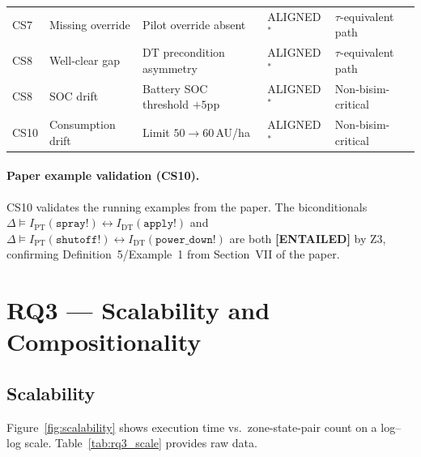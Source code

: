 \documentclass[10pt,a4paper]{article}
\newcommand{\WARN}[1]{\textcolor{warnred}{#1}}
\begin{document}
\begin{table}[htbp]
\begin{tabular}{@{}lllll@{}}
CS7  & Missing override & Pilot override absent                 & \WARN{ALIGNED${}^*$} & $\tau$-equivalent path \\
CS8  & Well-clear gap   & DT precondition asymmetry             & \WARN{ALIGNED${}^*$} & $\tau$-equivalent path \\
CS8  & SOC drift        & Battery SOC threshold $+5$pp          & \WARN{ALIGNED${}^*$} & Non-bisim-critical \\
CS10 & Consumption drift& Limit $50 \to 60$\,AU/ha              & \WARN{ALIGNED${}^*$} & Non-bisim-critical \\
\bottomrule
\end{tabular}
\end{table}

\paragraph{Paper example validation (CS10).}
CS10 validates the running examples from the paper.
The biconditionals $\Delta \models I_\text{PT}(\texttt{spray!}) \leftrightarrow
I_\text{DT}(\texttt{apply!})$ and
$\Delta \models I_\text{PT}(\texttt{shutoff!}) \leftrightarrow
I_\text{DT}(\texttt{power\_down!})$ are both \textbf{[ENTAILED]} by Z3,
confirming Definition~5/Example~1 from Section~VII of the paper.

\section{RQ3 — Scalability and Compositionality}

\subsection{Scalability}

Figure~\ref{fig:scalability} shows execution time vs.\ zone-state-pair count
on a log--log scale. Table~\ref{tab:rq3_scale} provides raw data.
\end{document}
